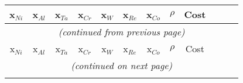 \begin{longtable}{rrrrrrrrrrrr}
    \multicolumn{1}{c}{x$_{Ni}$} & \multicolumn{1}{c}{x$_{Al}$} & \multicolumn{1}{c}{x$_{Ta}$} & \multicolumn{1}{c}{x$_{Cr}$} & \multicolumn{1}{c}{x$_{W}$} & \multicolumn{1}{c}{x$_{Re}$} & \multicolumn{1}{c}{x$_{Co}$} & \multicolumn{1}{c}{$\rho$} & \multicolumn{1}{c}{Cost} \\ \hline \hline
    \endfirsthead
    
    \multicolumn{12}{c}{\textit{(continued from previous page)}} \\
    \multicolumn{1}{c}{x$_{Ni}$} & \multicolumn{1}{c}{x$_{Al}$} & \multicolumn{1}{c}{x$_{Ta}$} & \multicolumn{1}{c}{x$_{Cr}$} & \multicolumn{1}{c}{x$_{W}$} & \multicolumn{1}{c}{x$_{Re}$} & \multicolumn{1}{c}{x$_{Co}$} & \multicolumn{1}{c}{$\rho$} & \multicolumn{1}{c}{Cost} \\ \hline \hline
    \endhead
    
    \multicolumn{12}{c}{\textit{(continued on next page)}} \\
    \endfoot
    
    \endlastfoot
    

\end{longtable}
